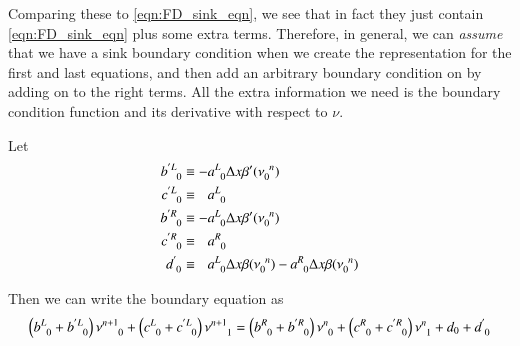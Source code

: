 \documentclass[letterpaper,12pt]{article}
\begin{document}
Comparing these to \ref{eqn:FD_sink_eqn}, we see that in fact they just contain \ref{eqn:FD_sink_eqn} plus some extra terms. Therefore, in general,
we can \emph{assume} that we have a sink boundary condition when we create the representation for the first and last equations, and then add an arbitrary
boundary condition on by adding on to the right terms. All the extra information we need is the boundary condition function and its derivative with
respect to $\nu$.

Let
\begin{align}
  b\indices{^{'L}_0} &\equiv          - a\indices{^L_0} \Delta x \beta'(\nu\indices{_0^n}) \\
  c\indices{^{'L}_0} &\equiv \phantom{-}a\indices{^L_0} \\
  b\indices{^{'R}_0} &\equiv          - a\indices{^L_0} \Delta x \beta'(\nu\indices{_0^n}) \\
  c\indices{^{'R}_0} &\equiv \phantom{-}a\indices{^R_0} \\
  d\indices{^{' }_0} &\equiv \phantom{-}a\indices{^L_0} \Delta x \beta (\nu\indices{_0^n}) - a\indices{^R_0} \Delta x \beta (\nu\indices{_0^n})
\end{align}

Then we can write the boundary equation as
\begin{equation}
  \left( b\indices{^L_0} + b\indices{^{'L}_0} \right) \nu\indices{^{n+1}_{0}}
+ \left( c\indices{^L_0} + c\indices{^{'L}_0} \right) \nu\indices{^{n+1}_{1}}
=
  \left( b\indices{^R_0} + b\indices{^{'R}_0} \right) \nu\indices{^{n  }_{0}}
+ \left( c\indices{^R_0} + c\indices{^{'R}_0} \right) \nu\indices{^{n  }_{1}}
+ d_0 + d\indices{^'_0}
\end{equation}
\end{document}
